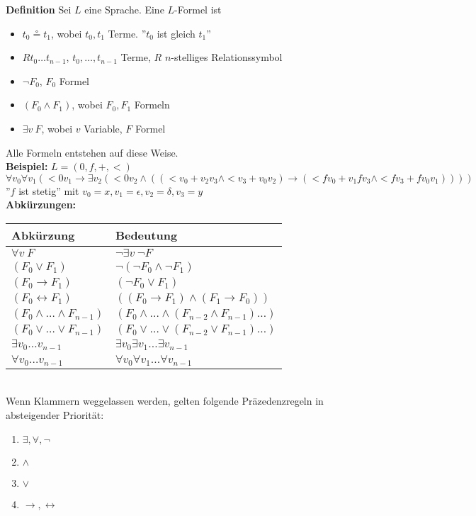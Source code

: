 \documentclass[a4paper]{scrartcl}
\begin{document}
\textbf{Definition} Sei $L$ eine Sprache. Eine $L$-Formel ist
\begin{itemize}
\item $t_0 \circeq t_1$, wobei $t_0,t_1$ Terme. ''$t_0$ ist gleich $t_1$''
\item $Rt_0 \dots t_{n-1}$, $t_0, \dots ,t_{n-1}$ Terme, $R$ $n$-stelliges Relationssymbol
\item $\lnot F_0$, $F_0$ Formel
\item $(F_0 \land F_1)$, wobei $F_0, F_1$ Formeln
\item $\exists v\ F$, wobei $v$ Variable, $F$ Formel
\end{itemize}
Alle Formeln entstehen auf diese Weise.\medskip\\
\textbf{Beispiel:} $L=(0,f,+,<)$\\
$\forall v_0\forall v_1 (<0v_1 \rightarrow \exists v_2(<0v_2 \land ((<v_0+v_2v_3 \land <v_3+v_0v_2)\rightarrow (<fv_0+v_1fv_3 \land <fv_3+fv_0v_1))))$\\
''$f$ ist stetig'' mit $v_0=x, v_1=\epsilon, v_2=\delta, v_3=y$\medskip\\
\textbf{Abkürzungen:}\smallskip\\
\begin{tabular}{l|l}
Abkürzung & Bedeutung\\\hline
$\forall v\ F$ & $\lnot\exists v\ \lnot F$\\
$(F_0 \lor F_1)$ & $\lnot (\lnot F_0 \land \lnot F_1)$\\
$(F_0 \rightarrow F_1)$ & $(\lnot F_0 \lor F_1)$\\
$(F_0 \leftrightarrow F_1)$ & $((F_0 \rightarrow F_1) \land (F_1 \rightarrow F_0))$\\
$(F_0 \land \dots \land F_{n-1})$ & $(F_0 \land \dots \land (F_{n-2} \land F_{n-1})\dots)$\\
$(F_0 \lor \dots \lor F_{n-1})$ & $(F_0 \lor \dots \lor (F_{n-2} \lor F_{n-1})\dots)$\\
$\exists v_0 \dots v_{n-1}$ & $\exists v_0 \exists v_1 \dots \exists v_{n-1}$\\
$\forall v_0 \dots v_{n-1}$ & $\forall v_0 \forall v_1 \dots \forall v_{n-1}$
\end{tabular}\ \smallskip\\
Wenn Klammern weggelassen werden, gelten folgende Präzedenzregeln in absteigender Priorität:
\begin{enumerate}
\item $\exists,\forall,\lnot$
\item $\land$
\item $\lor$
\item $\rightarrow,\leftrightarrow$
\end{enumerate}
\end{document}
